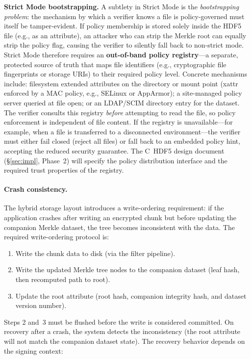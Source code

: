 \documentclass[11pt]{article}
\begin{document}
\noindent\textbf{Strict Mode bootstrapping.}
A subtlety in Strict Mode is the \emph{bootstrapping problem}: the mechanism
by which a verifier knows a file is policy-governed must itself be
tamper-evident.  If policy membership is stored solely inside the HDF5 file
(e.g., as an attribute), an attacker who can strip the Merkle root can equally
strip the policy flag, causing the verifier to silently fall back to
non-strict mode.  Strict Mode therefore requires an \textbf{out-of-band
policy registry}---a separate, protected source of truth that maps file
identifiers (e.g., cryptographic file fingerprints or storage URIs) to their
required policy level.  Concrete mechanisms include: filesystem extended
attributes on the directory or mount point (xattr enforced by a MAC policy,
e.g., SELinux or AppArmor); a site-managed policy server queried at file
open; or an LDAP/SCIM directory entry for the dataset.  The verifier consults
this registry \emph{before} attempting to read the file, so policy enforcement
is independent of file content.  If the registry is unavailable---for
example, when a file is transferred to a disconnected environment---the
verifier must either fail closed (reject all files) or fall back to an
embedded policy hint, accepting the reduced security guarantee.  The C~HDF5
design document (\S\ref{sec:impl}, Phase~2) will specify the policy
distribution interface and the required trust properties of the registry.

\paragraph{Crash consistency.}
The hybrid storage layout introduces a write-ordering requirement: if the
application crashes after writing an encrypted chunk but before updating the
companion Merkle dataset, the tree becomes inconsistent with the data. The
required write-ordering protocol is:
\begin{enumerate}[nosep]
  \item Write the chunk data to disk (via the filter pipeline).
  \item Write the updated Merkle tree nodes to the companion dataset
    (leaf hash, then recomputed path to root).
  \item Update the root attribute (root hash, companion integrity hash,
    and dataset version number).
\end{enumerate}
\noindent Steps 2 and~3 must be flushed before the write is considered
committed. On recovery after a crash, the system detects the inconsistency
(the root attribute will not match the companion dataset state). The recovery
behavior depends on the signing context:
\end{document}
